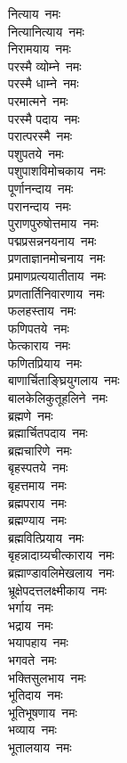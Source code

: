 \begin{multicols}{2}
\begin{flushleft}
नित्याय~नमः\hfill{}\\
नित्यानित्याय~नमः\\
निरामयाय~नमः\\
परस्मै व्योम्ने~नमः\\
परस्मै धाम्ने~नमः\\
परमात्मने~नमः\\
परस्मै पदाय~नमः\\
परात्परस्मै~नमः\\
पशुपतये~नमः\\
पशुपाशविमोचकाय~नमः\\
पूर्णानन्दाय~नमः\hfill{}\\
परानन्दाय~नमः\\
पुराणपुरुषोत्तमाय~नमः\\
पद्मप्रसन्ननयनाय~नमः\\
प्रणताज्ञानमोचनाय~नमः\\
प्रमाणप्रत्ययातीताय~नमः\\
प्रणतार्तिनिवारणाय~नमः\\
फलहस्ताय~नमः\\
फणिपतये~नमः\\
फेत्काराय~नमः\\
फणितप्रियाय~नमः\hfill{}\\
बाणार्चिताङ्घ्रियुगलाय~नमः\\
बालकेलिकुतूहलिने~नमः\\
ब्रह्मणे~नमः\\
ब्रह्मार्चितपदाय~नमः\\
ब्रह्मचारिणे~नमः\\
बृहस्पतये~नमः\\
बृहत्तमाय~नमः\\
ब्रह्मपराय~नमः\\
ब्रह्मण्याय~नमः\\
ब्रह्मवित्प्रियाय~नमः\hfill{}\\
बृहन्नादाग्र्यचीत्काराय~नमः\\
ब्रह्माण्डावलिमेखलाय~नमः\\
भ्रूक्षेपदत्तलक्ष्मीकाय~नमः\\
भर्गाय~नमः\\
भद्राय~नमः\\
भयापहाय~नमः\\
भगवते~नमः\\
भक्तिसुलभाय~नमः\\
भूतिदाय~नमः\\
भूतिभूषणाय~नमः\hfill{}\\
भव्याय~नमः\\
भूतालयाय~नमः\\

\end{flushleft}
\end{multicols}
